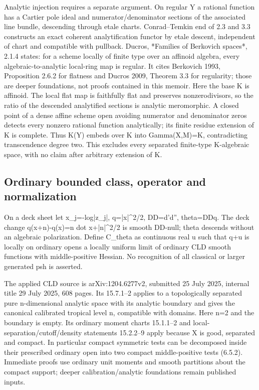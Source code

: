 \documentclass[11pt]{article}
\begin{document}
Analytic injection requires a separate argument. On regular Y a rational function has a Cartier pole ideal and numerator/denominator sections of the associated line bundle, descending through etale charts. Conrad--Temkin end of 2.3 and 3.3 constructs an exact coherent analytification functor by etale descent, independent of chart and compatible with pullback. Ducros, *Families of Berkovich spaces*, 2.1.4 states: for a scheme locally of finite type over an affinoid algebra, every algebraic-to-analytic local-ring map is regular. It cites Berkovich 1993, Proposition 2.6.2 for flatness and Ducros 2009, Theorem 3.3 for regularity; those are deeper foundations, not proofs contained in this memoir. Here the base K is affinoid. The local flat map is faithfully flat and preserves nonzerodivisors, so the ratio of the descended analytified sections is analytic meromorphic. A closed point of a dense affine scheme open avoiding numerator and denominator zeros detects every nonzero rational function analytically; its finite residue extension of K is complete. Thus K(Y) embeds over K into Gamma(X,M)=K, contradicting transcendence degree two. This excludes every separated finite-type K-algebraic space, with no claim after arbitrary extension of K.

\subsection*{Ordinary bounded class, operator and normalization}

On a deck sheet let x\_j=-log|z\_j|, q=|x|\textasciicircum{}2/2, DD=d'd'', theta=DDq. The deck change q(x+n)-q(x)=n dot x+|n|\textasciicircum{}2/2 is smooth DD-null; theta descends without an algebraic polarization. Define C\_theta as continuous real u such that q+u is locally on ordinary opens a locally uniform limit of ordinary CLD smooth functions with middle-positive Hessian. No recognition of all classical or larger generated psh is asserted.

The applied CLD source is arXiv:1204.6277v2, submitted 25 July 2025, internal title 29 July 2025, 608 pages. Its 15.7.1--2 applies to a topologically separated pure n-dimensional analytic space with its analytic boundary and gives the canonical calibrated tropical level n, compatible with domains. Here n=2 and the boundary is empty. Its ordinary moment charts 15.1.1--2 and local-separation/cutoff/density statements 15.2.2--9 apply because X is good, separated and compact. In particular compact symmetric tests can be decomposed inside their prescribed ordinary open into two compact middle-positive tests (6.5.2). Immediate proofs use ordinary unit moments and smooth partitions about the compact support; deeper calibration/analytic foundations remain published inputs.
\end{document}
